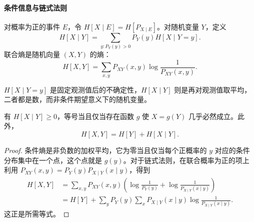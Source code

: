 \documentclass[lang=cn,a4paper,fontset=none,zihao=false,10pt,openany,twoside]{beautybook}
\numberwithin{algorithm}{chapter}
\begin{document}
\paragraph{条件信息与链式法则}
\begin{definition}[条件熵与联合熵]\label{def:conditional-entropy}
对概率为正的事件 $E$，令 $H[X\mid E]=H[P_{X\mid E}]$。对随机变量 $Y$，定义
\[
 H[X\mid Y]=\sum_{y:P_Y(y)>0}P_Y(y)H[X\mid Y=y].
\]
联合熵是随机向量 $(X,Y)$ 的熵：
\[
 H[X,Y]=\sum_{x,y}P_{XY}(x,y)\log\frac1{P_{XY}(x,y)}.
\]
\end{definition}
$H[X\mid Y=y]$ 是固定观测值后的不确定性，$H[X\mid Y]$ 则是再对观测值取平均，二者都是数，而非条件期望意义下的随机变量。
\begin{proposition}[熵的链式法则]\label{prop:entropy-chain}
有 $H[X\mid Y]\ge0$，等号当且仅当存在函数 $g$ 使 $X=g(Y)$ 几乎必然成立。此外，
\[
 H[X,Y]=H[Y]+H[X\mid Y].
\]
\end{proposition}
\begin{proof}
条件熵是非负数的加权平均，它为零当且仅当每个正概率的 $y$ 对应的条件分布集中在一个点，这个点就是 $g(y)$。对于链式法则，在联合概率为正的项上利用
$P_{XY}(x,y)=P_Y(y)P_{X\mid Y}(x\mid y)$，得到
\begin{align*}
 H[X,Y]&=\sum_{x,y}P_{XY}(x,y)\left(\log\frac1{P_Y(y)}+\log\frac1{P_{X\mid Y}(x\mid y)}\right)\\
 &=H[Y]+\sum_yP_Y(y)\sum_xP_{X\mid Y}(x\mid y)\log\frac1{P_{X\mid Y}(x\mid y)}.
\end{align*}
这正是所需等式。
\end{proof}
\end{document}
